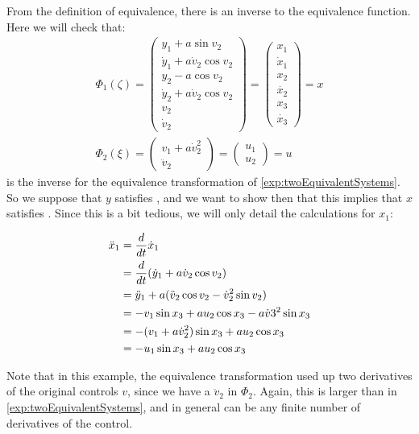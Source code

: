 \documentclass[12pt]{article}
\begin{document}
\begin{example}
  From the definition of equivalence, there is an inverse to the equivalence function.
  Here we will check that:
  \begin{align*}
    \Phi_1(\zeta)
    =    
    \begin{pmatrix}
      y_1 + a \sin{v_2} \\
      \dot{y}_1 + a \dot{v}_2 \cos{v_2} \\      
      y_2 - a \cos{v_2} \\
      \dot{y}_2 + a \dot{v}_2 \cos{v_2} \\
      v_2 \\
      \dot{v}_2
    \end{pmatrix}
    =
    \begin{pmatrix}
      x_1 \\ \dot{x}_1 \\ x_2 \\ \dot{x_2} \\ x_3 \\ \dot{x_3}
    \end{pmatrix}
    =
    x \\
    \Phi_2(\xi) =
    \begin{pmatrix}
      v_1 + a \dot{v}_2^2 \\
      \ddot{v}_2
    \end{pmatrix}
    =
    \begin{pmatrix}
      u_1 \\ u_2
    \end{pmatrix}
    =  
    u
  \end{align*}
  is the inverse for the equivalence transformation of \ref{exp:twoEquivalentSystems}.
  So we suppose that $y$ satisfies , and we want to
  show then that this implies that $x$ satisfies .
  Since this is a bit tedious, we will only detail the calculations for $x_1$:
  
  \begin{align*}
    \ddot{x}_1
    &= \frac{d}{dt}\dot{x}_1 \\
    &= \frac{d}{dt}( \dot{y}_1 + a \dot{v}_2 \cos{v_2} ) \\
    &= \ddot{y}_1 + a ( \ddot{v}_2 \cos{v_2} - \dot{v}_2^2 \sin{v_2} ) \\
    &= -v_1 \sin{x_3} + a u_2 \cos{x_3} - a \dot{v}3^2 \sin{x_3} \\
    &= - ( v_1 + a \dot{v}_2^2 ) \sin{x_3} + a u_2 \cos{x_3} \\
    &= -u_1 \sin{x_3} + a u_2 \cos{x_3}
  \end{align*}
  
  Note that in this example, the equivalence transformation used up two derivatives
  of the original controls $v$, since we have a $\ddot{v}_2$ in $\Phi_2$.
  Again, this is larger than in \ref{exp:twoEquivalentSystems}, and in general
  can be any finite number of derivatives of the control.
\end{example}
\end{document}
